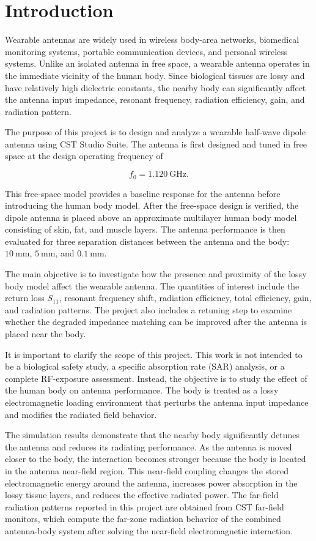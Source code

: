 \section{Introduction}

Wearable antennas are widely used in wireless body-area networks, biomedical monitoring systems, portable communication devices, and personal wireless systems. Unlike an isolated antenna in free space, a wearable antenna operates in the immediate vicinity of the human body. Since biological tissues are lossy and have relatively high dielectric constants, the nearby body can significantly affect the antenna input impedance, resonant frequency, radiation efficiency, gain, and radiation pattern.

The purpose of this project is to design and analyze a wearable half-wave dipole antenna using CST Studio Suite. The antenna is first designed and tuned in free space at the design operating frequency of

\[
f_0 = 1.120~\mathrm{GHz}.
\]

This free-space model provides a baseline response for the antenna before introducing the human body model. After the free-space design is verified, the dipole antenna is placed above an approximate multilayer human body model consisting of skin, fat, and muscle layers. The antenna performance is then evaluated for three separation distances between the antenna and the body: \(10~\mathrm{mm}\), \(5~\mathrm{mm}\), and \(0.1~\mathrm{mm}\).

The main objective is to investigate how the presence and proximity of the lossy body model affect the wearable antenna. The quantities of interest include the return loss \(S_{11}\), resonant frequency shift, radiation efficiency, total efficiency, gain, and radiation patterns. The project also includes a retuning step to examine whether the degraded impedance matching can be improved after the antenna is placed near the body.

It is important to clarify the scope of this project. This work is not intended to be a biological safety study, a specific absorption rate (SAR) analysis, or a complete RF-exposure assessment. Instead, the objective is to study the effect of the human body on antenna performance. The body is treated as a lossy electromagnetic loading environment that perturbs the antenna input impedance and modifies the radiated field behavior.

The simulation results demonstrate that the nearby body significantly detunes the antenna and reduces its radiating performance. As the antenna is moved closer to the body, the interaction becomes stronger because the body is located in the antenna near-field region. This near-field coupling changes the stored electromagnetic energy around the antenna, increases power absorption in the lossy tissue layers, and reduces the effective radiated power. The far-field radiation patterns reported in this project are obtained from CST far-field monitors, which compute the far-zone radiation behavior of the combined antenna-body system after solving the near-field electromagnetic interaction.
